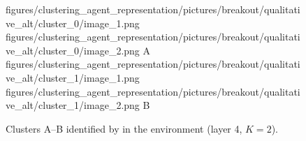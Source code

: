\begin{figure}[H]
    \qualitativeClusterFigureSetup
    \qualitativeClusterTwo
        {figures/clustering_agent_representation/pictures/breakout/qualitative_alt/cluster_0/image_1.png}
        {figures/clustering_agent_representation/pictures/breakout/qualitative_alt/cluster_0/image_2.png}
        {A}
    \qualitativeClusterTwo
        {figures/clustering_agent_representation/pictures/breakout/qualitative_alt/cluster_1/image_1.png}
        {figures/clustering_agent_representation/pictures/breakout/qualitative_alt/cluster_1/image_2.png}
        {B}
    \caption{Clusters A--B identified by  in the \BreakoutName environment (layer 4, $K=2$).}
    \label{fig:qualitative_breakout_alt}
\end{figure}
